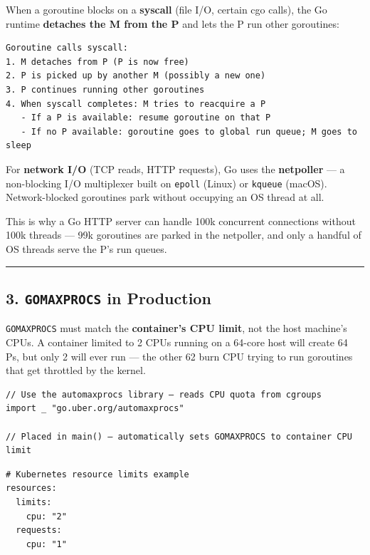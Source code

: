 \documentclass[11pt,a4paper,oneside]{book}
\begin{document}
When a goroutine blocks on a \textbf{syscall} (file I/O, certain cgo
calls), the Go runtime \textbf{detaches the M from the P} and lets the P
run other goroutines:

\begin{verbatim}
Goroutine calls syscall:
1. M detaches from P (P is now free)
2. P is picked up by another M (possibly a new one)
3. P continues running other goroutines
4. When syscall completes: M tries to reacquire a P
   - If a P is available: resume goroutine on that P
   - If no P available: goroutine goes to global run queue; M goes to sleep
\end{verbatim}

For \textbf{network I/O} (TCP reads, HTTP requests), Go uses the
\textbf{netpoller} --- a non-blocking I/O multiplexer built on
\texttt{epoll} (Linux) or \texttt{kqueue} (macOS). Network-blocked
goroutines park without occupying an OS thread at all.

This is why a Go HTTP server can handle 100k concurrent connections
without 100k threads --- 99k goroutines are parked in the netpoller, and
only a handful of OS threads serve the P's run queues.

\begin{center}\rule{0.5\linewidth}{0.5pt}\end{center}

\subsection{\texorpdfstring{3. \texttt{GOMAXPROCS} in
Production}{3. GOMAXPROCS in Production}}

\texttt{GOMAXPROCS} must match the \textbf{container's CPU limit}, not
the host machine's CPUs. A container limited to 2 CPUs running on a
64-core host will create 64 Ps, but only 2 will ever run --- the other
62 burn CPU trying to run goroutines that get throttled by the kernel.

\begin{verbatim}
// Use the automaxprocs library — reads CPU quota from cgroups
import _ "go.uber.org/automaxprocs"

// Placed in main() — automatically sets GOMAXPROCS to container CPU limit
\end{verbatim}

\begin{verbatim}
# Kubernetes resource limits example
resources:
  limits:
    cpu: "2"
  requests:
    cpu: "1"
\end{verbatim}
\end{document}
